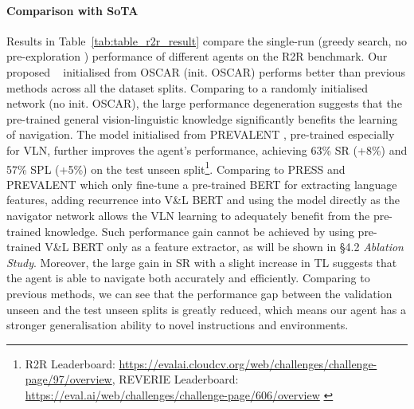 \documentclass[final]{cvpr}
\begin{document}
\paragraph{Comparison with SoTA}
Results in Table~\ref{tab:table_r2r_result} compare the single-run (greedy search, no pre-exploration \cite{wang2019reinforced}) performance of different agents on the R2R benchmark. Our proposed \vlnbert~ initialised from OSCAR \cite{li2020oscar} (init. OSCAR) performs better than previous methods across all the dataset splits. Comparing to a randomly initialised network (no init. OSCAR), the large performance degeneration suggests that the pre-trained general vision-linguistic knowledge significantly benefits the learning of navigation. The model initialised from PREVALENT \cite{hao2020towards}, pre-trained especially for VLN, further improves the agent's performance, achieving 63\% SR (+8\%) and 57\% SPL (+5\%) on the test unseen split\footnote{R2R Leaderboard: \href{https://evalai.cloudcv.org/web/challenges/challenge-page/97/overview}{https://evalai.cloudcv.org/web/challenges/challenge-page/97/overview}, REVERIE Leaderboard:\\ \href{https://eval.ai/web/challenges/challenge-page/606/overview}{https://eval.ai/web/challenges/challenge-page/606/overview} \label{footnote_leaderboard}}. Comparing to PRESS \cite{li2019robust} and PREVALENT \cite{hao2020towards} which only fine-tune a pre-trained BERT for extracting language features, adding recurrence into V\&L BERT and using the model directly as the navigator network allows the VLN learning to adequately benefit from the pre-trained knowledge. Such performance gain cannot be achieved by using pre-trained V\&L BERT only as a feature extractor, as will be shown in \S 4.2 \textit{Ablation Study}. Moreover, the large gain in SR with a slight increase in TL suggests that the agent is able to navigate both accurately and efficiently. Comparing to previous methods, we can see that the performance gap between the validation unseen and the test unseen splits is greatly reduced, which means our agent has a stronger generalisation ability to novel instructions and environments.
\end{document}
